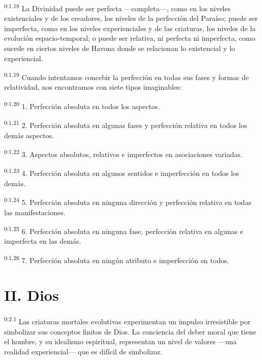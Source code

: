 \par
\textsuperscript{0:1.18} La Divinidad puede ser perfecta ---completa---, como en los niveles existenciales y de los creadores, los niveles de la perfección del Paraíso; puede ser imperfecta, como en los niveles experienciales y de las criaturas, los niveles de la evolución espacio-temporal; o puede ser relativa, ni perfecta ni imperfecta, como sucede en ciertos niveles de Havona donde se relacionan lo existencial y lo experiencial.

\par
\textsuperscript{0:1.19} Cuando intentamos concebir la perfección en todas sus fases y formas de relatividad, nos encontramos con siete tipos imaginables:

\par
\textsuperscript{0:1.20} 1. Perfección absoluta en todos los aspectos.

\par
\textsuperscript{0:1.21} 2. Perfección absoluta en algunas fases y perfección relativa en todos los demás aspectos.

\par
\textsuperscript{0:1.22} 3. Aspectos absolutos, relativos e imperfectos en asociaciones variadas.

\par
\textsuperscript{0:1.23} 4. Perfección absoluta en algunos sentidos e imperfección en todos los demás.

\par
\textsuperscript{0:1.24} 5. Perfección absoluta en ninguna dirección y perfección relativa en todas las manifestaciones.

\par
\textsuperscript{0:1.25} 6. Perfección absoluta en ninguna fase, perfección relativa en algunas e imperfecta en las demás.

\par
\textsuperscript{0:1.26} 7. Perfección absoluta en ningún atributo e imperfección en todos.

\section*{II. Dios}
\par
\textsuperscript{0:2.1} Las criaturas mortales evolutivas experimentan un impulso irresistible por simbolizar sus conceptos finitos de Dios. La conciencia del deber moral que tiene el hombre, y su idealismo espiritual, representan un nivel de valores ---una realidad experiencial--- que es difícil de simbolizar.

